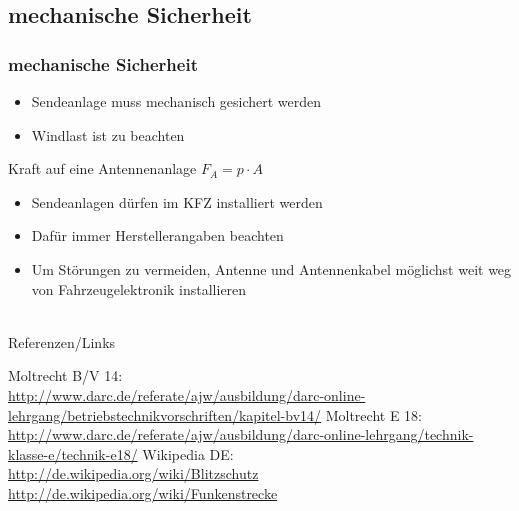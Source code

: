 \subsection{mechanische Sicherheit}

\begin{frame}
	\frametitle{mechanische Sicherheit}
	\begin{itemize}
		\item	Sendeanlage muss mechanisch gesichert werden
		\item	Windlast ist zu beachten
	\end{itemize}
	\begin{block}{Kraft auf eine Antennenanlage}
		\Large{$F_{A} = p \cdot A$}
	\end{block}	
	\begin{itemize}
		\item	Sendeanlagen dürfen im KFZ installiert werden
		\item	Dafür immer Herstellerangaben beachten
		\item	Um Störungen zu vermeiden, Antenne und Antennenkabel möglichst weit weg von 					Fahrzeugelektronik installieren
	\end{itemize}
\end{frame}

\renewcommand{\refname}{Referenzen}

\hypertarget{refs}{}
\textcolor{white}{} \\ %
\Large Referenzen/Links
\footnotesize

\begin{thebibliography}{}
      Moltrecht B/V 14: \\
                    \url{http://www.darc.de/referate/ajw/ausbildung/darc-online-lehrgang/betriebstechnikvorschriften/kapitel-bv14/}
       Moltrecht E 18: \\
                    \url{http://www.darc.de/referate/ajw/ausbildung/darc-online-lehrgang/technik-klasse-e/technik-e18/}
        Wikipedia DE: \\
                    \url{http://de.wikipedia.org/wiki/Blitzschutz}\\ 
                    \url{http://de.wikipedia.org/wiki/Funkenstrecke}\\  
\end{thebibliography} 


